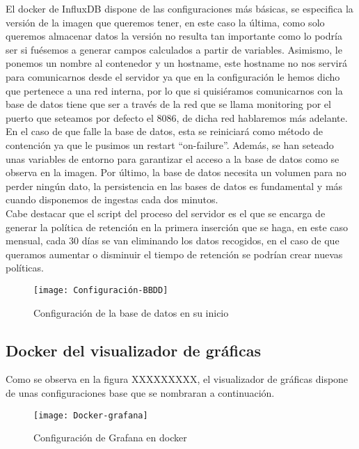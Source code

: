 \documentclass[ spanish, a4paper, 12pt, oneside]{report}
\begin{document}
El docker de InfluxDB dispone de las configuraciones más básicas, se especifica la versión de la imagen que queremos tener, en este caso la última, como solo queremos almacenar datos la versión no resulta tan importante como lo podría ser si fuésemos a generar campos calculados a partir de variables. Asimismo, le ponemos un nombre al contenedor y un 
hostname, este hostname no nos servirá para comunicarnos desde el servidor ya que en la configuración le hemos dicho que pertenece a una red interna, por lo que si quisiéramos comunicarnos con la base de datos tiene que ser a través de la red que se llama monitoring por el puerto que seteamos por defecto el 8086, de dicha red hablaremos más adelante. En 
el caso de que falle la base de datos, esta se reiniciará como método de contención ya que le pusimos un restart ``on-failure''. Además, se han seteado unas variables de entorno para garantizar el acceso a la base de datos como se observa en la imagen. Por último, la base de datos necesita un volumen para no perder ningún dato, la persistencia en las bases de 
datos es fundamental y más cuando disponemos de ingestas cada dos minutos.\\

Cabe destacar que el script del proceso del servidor es el que se encarga de generar la política de retención en la primera inserción que se haga, en este caso mensual, cada 30 días se van eliminando los datos recogidos, en el caso de que queramos aumentar o disminuir el tiempo de retención se podrían crear nuevas políticas. \\

\begin{figure}[!h]
   \centering
   \texttt{[image: Configuración-BBDD]}\\
      \caption{\label{fig: Configuración de la base de datos en su inicio} Configuración de la base de datos en su inicio}
\end{figure}
\subsection{Docker del visualizador de gráficas}
Como se observa en la figura XXXXXXXXX, el visualizador de gráficas dispone de unas configuraciones base que se nombraran a continuación.\\

\begin{figure}[!h]
   \centering
   \texttt{[image: Docker-grafana]}\\
      \caption{\label{fig: Configuración de Grafana en docker} Configuración de Grafana en docker}
\end{figure}
\end{document}
